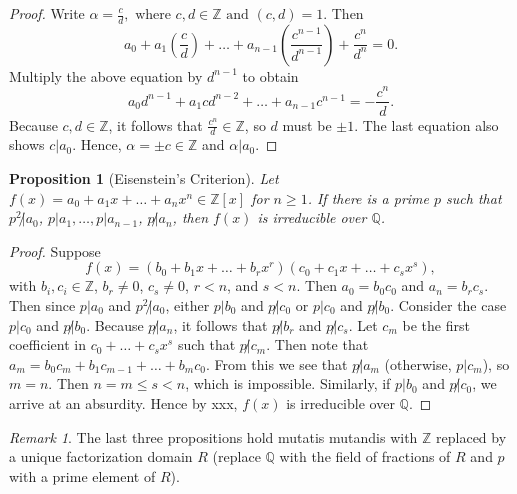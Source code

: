\documentclass[draft]{article}
\newtheorem{prop}[thm]{Proposition}
\theoremstyle{definition}
\theoremstyle{remark}
\newtheorem{rem}{Remark}[section]
\begin{document}
			\begin{proof}
				Write $\alpha = \frac{c}{d}, \text{ where } c, d \in \mathbb{Z} \text{ and } (c, d) = 1$. Then
				\begin{equation*}
					a_0 + a_1(\frac{c}{d}) + \dots + a_{n - 1}(\frac{c^{n - 1}}{d^{n - 1}}) + \frac{c^n}{d^n} = 0.
				\end{equation*}
				Multiply the above equation by $d^{n - 1}$ to obtain
				\begin{equation*}
					a_0d^{n - 1} + a_1cd^{n - 2} + \dots + a_{n - 1}c^{n - 1} = -\frac{c^n}{d}.
				\end{equation*}
				Because $c, d \in \mathbb{Z}$, it follows that $\frac{c^n}{d} \in \mathbb{Z}$, so $d$ must be $\pm 1$. The last equation also shows $c | a_0$. Hence, $\alpha = \pm c \in \mathbb{Z}$ and $\alpha | a_0$.
			\end{proof}
			
			\begin{prop}[Eisenstein's Criterion]
				Let $f(x) = a_0 + a_1x + \dots + a_{n}x^n \in \mathbb{Z}[x]$ for $n \geq 1$. If there is a prime $p$ such that $p^2 \not| a_0$, $p | a_1, \dots, p | a_{n - 1}$, $p \not| a_n$, then $f(x)$ is irreducible over $\mathbb{Q}$.
			\end{prop}
			
			\begin{proof}
				Suppose\begin{equation*}
					f(x) = (b_0 + b_1x + \dots + b_rx^r)(c_0 + c_1x + \dots + c_sx^s),
				\end{equation*}
				with $b_i, c_i \in \mathbb{Z}$, $b_r \neq 0$, $c_s \neq 0$, $r < n$, and $s < n$. Then $a_0 = b_0c_0$ and $a_n = b_rc_s$. Then since $p | a_0$ and $p^2 \not| a_0$, either $p | b_0$ and $p \not| c_0$ or $p | c_0$ and $p \not| b_0$. Consider the case $p | c_0$ and $p \not| b_0$. Because $p \not| a_n$, it follows that $p \not| b_r$ and $p \not| c_s$. Let $c_m$ be the first coefficient in $c_0 + \dots + c_sx^s$ such that $p \not| c_m$. Then note that $a_m = b_0c_m + b_1c_{m - 1} + \dots + b_mc_0$. From this we see that $p \not| a_m$ (otherwise, $p | c_m$), so $m = n$. Then $n = m \leq s < n$, which is impossible. Similarly, if $p | b_0$ and $p \not| c_0$, we arrive at an absurdity. Hence by xxx, $f(x)$ is irreducible over $\mathbb{Q}$.
			\end{proof}
			
			\begin{rem}
			    The last three propositions hold mutatis mutandis with $\mathbb{Z}$ replaced by a unique factorization domain $R$ (replace $\mathbb{Q}$ with the field of fractions of $R$ and $p$ with a prime element of $R$).
			\end{rem}
			
\end{document}
